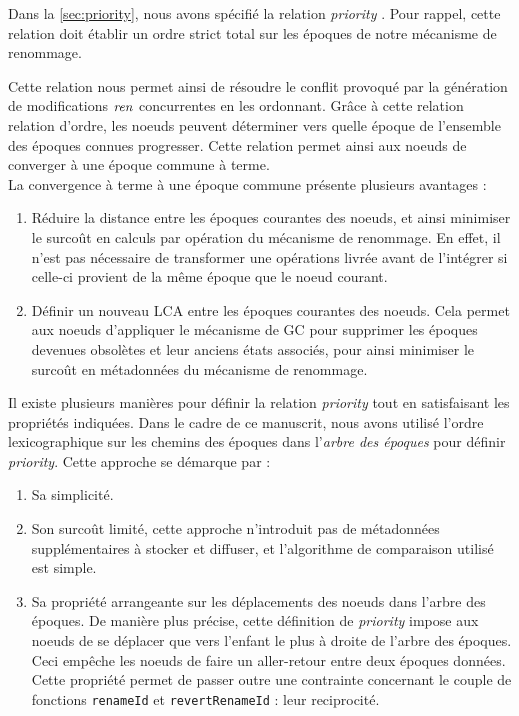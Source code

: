\label{sec:alternative-priority}

Dans la \autoref{sec:priority}, nous avons spécifié la relation \emph{priority} .
Pour rappel, cette relation doit établir un ordre strict total sur les époques de notre mécanisme de renommage.

Cette relation nous permet ainsi de résoudre le conflit provoqué par la génération de modifications $\mathit{ren}$ concurrentes en les ordonnant.
Grâce à cette relation relation d'ordre, les noeuds peuvent déterminer vers quelle époque de l'ensemble des époques connues progresser.
Cette relation permet ainsi aux noeuds de converger à une époque commune à terme.\\

La convergence à terme à une époque commune présente plusieurs avantages :
\begin{enumerate}
    \item Réduire la distance entre les époques courantes des noeuds, et ainsi minimiser le surcoût en calculs par opération du mécanisme de renommage.
        En effet, il n'est pas nécessaire de transformer une opérations livrée avant de l'intégrer si celle-ci provient de la même époque que le noeud courant.
    \item Définir un nouveau \ac{LCA} entre les époques courantes des noeuds.
        Cela permet aux noeuds d'appliquer le mécanisme de \ac{GC} pour supprimer les époques devenues obsolètes et leur anciens états associés, pour ainsi minimiser le surcoût en métadonnées du mécanisme de renommage.
\end{enumerate}

Il existe plusieurs manières pour définir la relation \emph{priority} tout en satisfaisant les propriétés indiquées.
Dans le cadre de ce manuscrit, nous avons utilisé l'ordre lexicographique sur les chemins des époques dans l'\emph{arbre des époques} pour définir \emph{priority}.
Cette approche se démarque par :
\begin{enumerate}
    \item Sa simplicité.
    \item Son surcoût limité, \ie cette approche n'introduit pas de métadonnées supplémentaires à stocker et diffuser, et l'algorithme de comparaison utilisé est simple.
    \item Sa propriété arrangeante sur les déplacements des noeuds dans l'arbre des époques.
        De manière plus précise, cette définition de \emph{priority} impose aux noeuds de se déplacer que vers l'enfant le plus à droite de l'arbre des époques.
        Ceci empêche les noeuds de faire un aller-retour entre deux époques données.
        Cette propriété permet de passer outre une contrainte concernant le couple de fonctions \texttt{renameId} et \texttt{revertRenameId} : leur reciprocité.
\end{enumerate}

